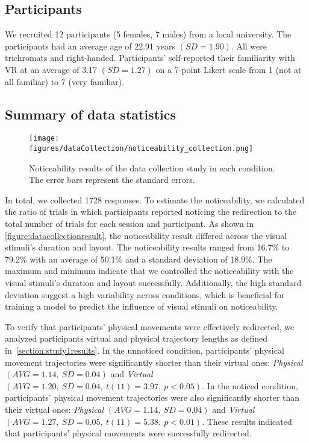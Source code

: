 \subsection{Participants}
We recruited 12 participants (5 females, 7 males) from a local university.
The participants had an average age of 22.91 years $(SD=1.90)$. All were trichromats and right-handed. 
Participants' self-reported their familiarity with VR at an average of 3.17 $(SD=1.27)$ on a 7-point Likert scale from 1 (not at all familiar) to 7 (very familiar).

\subsection{Summary of data statistics}

\begin{figure}[!htbp]
    \centering
    \texttt{[image: figures/dataCollection/noticeability\_collection.png]}
    \caption{Noticeability results of the data collection study in each condition. The error bars represent the standard errors.}
    \label{figure:datacollectionresult}
\end{figure}

In total, we collected 1728 responses.
To estimate the noticeability, we calculated the ratio of trials in which participants reported noticing the redirection to the total number of trials for each session and participant.
As shown in \autoref{figure:datacollectionresult}, the noticeability result differed across the visual stimuli's duration and layout.
The noticeability results ranged from 16.7\% to 79.2\% with an average of 50.1\% and a standard deviation of 18.9\%.
The maximum and minimum indicate that we controlled the noticeability with the visual stimuli's duration and layout successfully.
Additionally, the high standard deviation suggest a high variability across conditions, which is beneficial for training a model to predict the influence of visual stimuli on noticeability.

To verify that participants' physical movements were effectively redirected, we analyzed participants virtual and physical trajectory lengths as defined in~\autoref{section:study1results}.
In the unnoticed condition, participants' physical movement trajectories were significantly shorter than their virtual ones: \textit{Physical} $(AVG = 1.14,~SD = 0.04)$ and \textit{Virtual} $(AVG = 1.20,~SD = 0.04,~t(11) = 3.97,~p < 0.05)$.
In the noticed condition, participants' physical movement trajectories were also significantly shorter than their virtual ones: \textit{Physical} $(AVG = 1.14,~SD = 0.04)$ and \textit{Virtual} $(AVG = 1.27,~SD = 0.05,~t(11) = 5.38,~p < 0.01)$.
These results indicated that participants' physical movements were successfully redirected.

